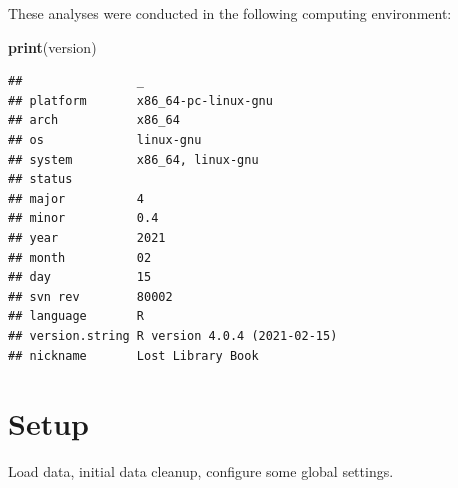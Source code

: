\documentclass[]{book}
\newenvironment{Shaded}{\begin{snugshade}}{\end{snugshade}}
\newcommand{\KeywordTok}[1]{\textcolor[rgb]{0.13,0.29,0.53}{\textbf{#1}}}
\newcommand{\NormalTok}[1]{#1}
\begin{document}
These analyses were conducted in the following computing environment:

\begin{Shaded}
\begin{Highlighting}[]
\KeywordTok{print}\NormalTok{(version)}
\end{Highlighting}
\end{Shaded}

\begin{verbatim}
##                _                           
## platform       x86_64-pc-linux-gnu         
## arch           x86_64                      
## os             linux-gnu                   
## system         x86_64, linux-gnu           
## status                                     
## major          4                           
## minor          0.4                         
## year           2021                        
## month          02                          
## day            15                          
## svn rev        80002                       
## language       R                           
## version.string R version 4.0.4 (2021-02-15)
## nickname       Lost Library Book
\end{verbatim}

\hypertarget{setup-1}{%
\section{Setup}\label{setup-1}}

Load data, initial data cleanup, configure some global settings.
\end{document}
